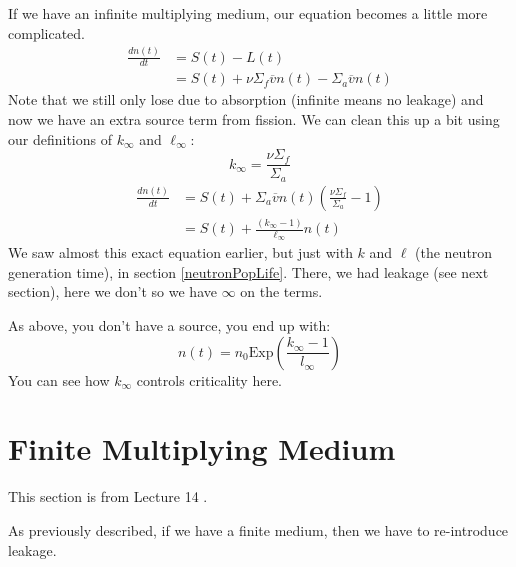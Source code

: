 \documentclass[letter]{article}
\begin{document}
\vspace{10pt}
If we have an infinite multiplying medium, our equation becomes a
little more complicated.
\begin{equation*}
  \begin{split}
        \frac{dn(t)}{dt}&=S(t)-L(t) \\
        &=S(t)+\nu\Sigma_f\overline{v}n(t)-\Sigma_a\overline{v}n(t)
  \end{split}
\end{equation*}
Note that we still only lose due to absorption (infinite means no
leakage) and now we have an extra source term from fission. We can
clean this up a bit using our definitions of $k_\infty$ and
$\ell_\infty$:
\begin{equation*}
  k_\infty=\frac{\nu\Sigma_f}{\Sigma_a}
\end{equation*}
\begin{equation*}
  \begin{split}
      \frac{dn(t)}{dt}&=S(t)+\Sigma_a\overline{v}n(t)\left(\frac{\nu\Sigma_f}{\Sigma_a}-1\right) \\
      &=S(t)+\frac{(k_\infty-1)}{\ell_\infty}n(t)
  \end{split}
\end{equation*}
We saw almost this exact equation earlier, but just with $k$ and
$\ell$ (the neutron generation time), in section
\ref{neutronPopLife}. There, we had leakage (see next section), here
we don't so we have $\infty$ on the terms.

As above, you don't have a source, you end up with:
\begin{equation*}
  n(t)=n_0\text{Exp}\left(\frac{k_\infty-1}{l_\infty}\right)
\end{equation*}
You can see how $k_\infty$ controls criticality here.

\section{Finite Multiplying Medium}

This section is from Lecture 14 \cite{lecture}.

As previously described, if we have a finite medium, then we have to
re-introduce leakage.




\end{document}

